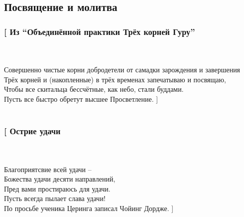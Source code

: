 \subsection*{Посвящение и молитва}
\vspace{1cm}
\subsubsection*{[ Из “Объединённой практики Трёх корней Гуру”}\\
\\
Совершенно чистые корни добродетели от самадки зарождения и завершения\\
Трёх корней и (накопленные) в трёх временах запечатываю и посвящаю,\\
Чтобы все скитальца бессчётные, как небо, стали буддами.\\
Пусть все быстро обретут высшее Просветление. ]\\
\\
\subsubsection*{[ Острие удачи}\\
\\
Благоприятсвие всей удачи – \\
Божества удачи десяти направлений,\\
Пред вами простираюсь для удачи.\\
Пусть всегда пылает слава удачи!\\
\scriptsize
По просьбе ученика Церинга записал Чойинг Дордже.
\normalsize
 ]\\
\\
